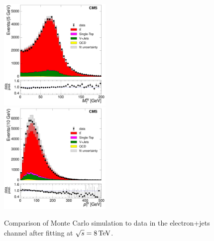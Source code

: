 \begin{figure}[hbtp]
     \includegraphics[width=0.48\textwidth]{Chapters/04_Analysis/04b_XSections/images/control_plots/after_fit/8TeV/EPlusJets_patType1CorrectedPFMet_MT_2orMoreBtags_with_ratio.pdf}\\     
	 \includegraphics[width=0.48\textwidth]{Chapters/04_Analysis/04b_XSections/images/control_plots/after_fit/8TeV/EPlusJets_patType1CorrectedPFMet_WPT_2orMoreBtags_with_ratio.pdf}\hfill
	 \caption{Comparison of Monte Carlo simulation to data in the electron+jets channel after fitting at
	 $\sqrt{s}=8\,\text{Te\hspace{-.08em}V}$.}
     \label{fig:data_mc_comparison_after_fit_8TeV_electron}
\end{figure}

